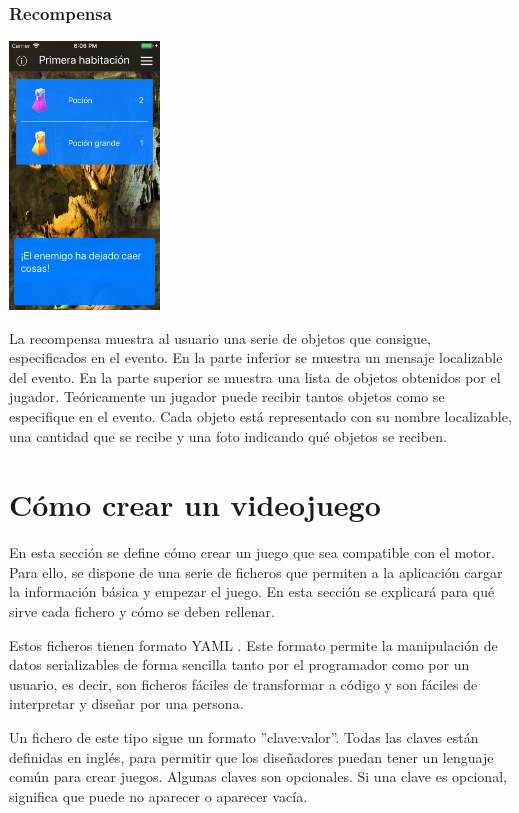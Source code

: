 \subsubsection{Recompensa}
\begin{center}
	\includegraphics[width=0.3\textwidth]{include/snapshots/reward.jpg}
\end{center}
La recompensa muestra al usuario una serie de objetos que consigue, especificados en el evento.
En la parte inferior se muestra un mensaje localizable del evento. En la parte superior se muestra una lista de objetos obtenidos por el jugador. Teóricamente un jugador puede recibir tantos objetos como se especifique en el evento.
Cada objeto está representado con su nombre localizable, una cantidad que se recibe y una foto indicando qué objetos se reciben.

\section{Cómo crear un videojuego} \label{developmentGuide}
En esta sección se define cómo crear un juego que sea compatible con el motor. Para ello, se dispone de una serie de ficheros que permiten a la aplicación cargar la información básica y empezar el juego. En esta sección se explicará para qué sirve cada fichero y cómo se deben rellenar.

Estos ficheros tienen formato YAML \cite{yamlDocumentation}. Este formato permite la manipulación de datos serializables de forma sencilla tanto por el programador como por un usuario, es decir, son ficheros fáciles de transformar a código y son fáciles de interpretar y diseñar por una persona. 

Un fichero de este tipo sigue un formato ''clave:valor''. Todas las claves están definidas en inglés, para permitir que los diseñadores puedan tener un lenguaje común para crear juegos.
Algunas claves son opcionales. Si una clave es opcional, significa que puede no aparecer o aparecer vacía.

